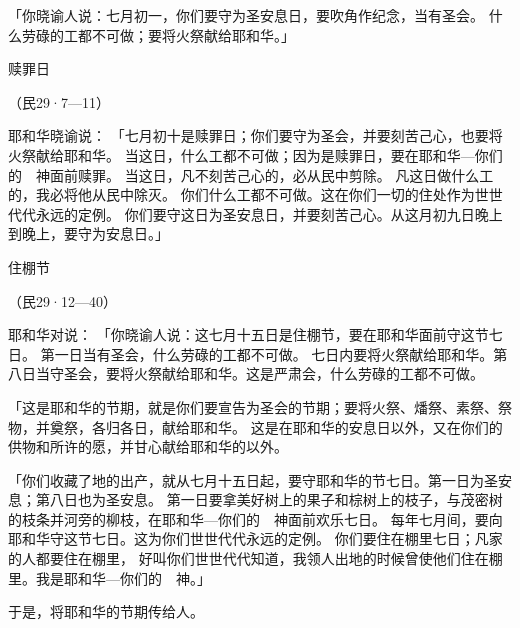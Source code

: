 {「你晓谕{}人说：七月初一，你们要守为圣安息日，要吹角作纪念，当有圣会。
什么劳碌的工都不可做；要将火祭献给耶和华。」
\par }{\SH 赎罪日
\par }{\R （民29·7—11）
\par }{\PP {}耶和华晓谕{}说：
「七月初十是赎罪日；你们要守为圣会，并要刻苦己心，也要将火祭献给耶和华。
当这日，什么工都不可做；因为是赎罪日，要在耶和华—你们的　神面前赎罪。
当这日，凡不刻苦己心的，必从民中剪除。
凡这日做什么工的，我必将他从民中除灭。
你们什么工都不可做。这在你们一切的住处作为世世代代永远的定例。
你们要守这日为圣安息日，并要刻苦己心。从这月初九日晚上到{}晚上，要守为安息日。」
\par }{\SH 住棚节
\par }{\R （民29·12—40）
\par }{\PP {}耶和华对{}说：
「你晓谕{}人说：这七月十五日是住棚节，要在耶和华面前守这节七日。
第一日当有圣会，什么劳碌的工都不可做。
七日内要将火祭献给耶和华。第八日当守圣会，要将火祭献给耶和华。这是严肃会，什么劳碌的工都不可做。
\par }{\PP {}「这是耶和华的节期，就是你们要宣告为圣会的节期；要将火祭、燔祭、素祭、祭物，并奠祭，各归各日，献给耶和华。
这是在耶和华的安息日以外，又在你们的供物和所许的愿，并甘心献给耶和华的以外。
\par }{\PP {}「你们收藏了地的出产，就从七月十五日起，要守耶和华的节七日。第一日为圣安息；第八日也为圣安息。
第一日要拿美好树上的果子和棕树上的枝子，与茂密树的枝条并河旁的柳枝，在耶和华—你们的　神面前欢乐七日。
每年七月间，要向耶和华守这节七日。这为你们世世代代永远的定例。
你们要住在棚里七日；凡{}家的人都要住在棚里，
好叫你们世世代代知道，我领{}人出{}地的时候曾使他们住在棚里。我是耶和华—你们的　神。」
\par }{\PP {}于是，{}将耶和华的节期传给{}人。

}
